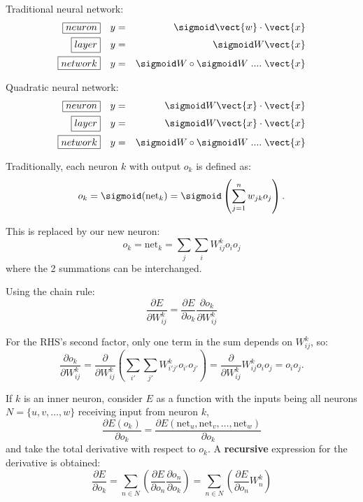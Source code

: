 Traditional neural network:
\begin{eqnarray}
\boxed{neuron} \quad & y = & \sigmoid \vect{w} \cdot \vect{x} \nonumber \\
\boxed{layer} \quad & y = & \sigmoid W \vect{x} \nonumber \\
\boxed{network} \quad & y = & \sigmoid W \circ \sigmoid W \; .... \; \vect{x} 
\end{eqnarray}

Quadratic neural network:
\begin{eqnarray}
\boxed{neuron} \quad & y = & \sigmoid W \vect{x} \cdot \vect{x} \nonumber \\
\boxed{layer} \quad & y = & \sigmoid W \vect{x} \cdot \vect{x} \nonumber \\
\boxed{network} \quad & y = & \sigmoid W \circ \sigmoid W \; .... \; \vect{x} 
\end{eqnarray}

Traditionally, each neuron $k$ with output $o_k$ is defined as:
\begin{equation}
o_k = \sigmoid ({\text{net}}_k) = \sigmoid \left(\sum _{j=1}^{n} w_{jk} o_j \right) .
\end{equation}

This is replaced by our new neuron:
\begin{equation}
o_k = {\text{net}}_k = \sum_j \sum_i W_{ij}^k o_i o_j
\end{equation}
where the 2 summations can be interchanged.

Using the chain rule:
\begin{equation}
\frac{\partial E}{\partial W_{ij}^k}
= \frac{\partial E}{\partial o_k} \frac{\partial o_k}{\partial W_{ij}^k}
\end{equation}

For the RHS's second factor, only one term in the sum depends on $W_{ij}^k$, so:
\begin{equation}
\frac{\partial o_k}{\partial W_{ij}^k}
= \frac{\partial }{\partial W_{ij}^k} \left( \sum_{i'} \sum_{j'} W_{i' j'}^k o_{i'} o_{j'} \right)
= \frac{\partial }{\partial W_{ij}^k} W_{ij}^k o_i o_j = o_i o_j .
\end{equation}

If $k$ is an inner neuron, consider $E$ as a function with the inputs being all neurons $N = \{ u, v, \dots , w \}$  receiving input from neuron $k$,
\begin{equation}
\frac{\partial E(o_k)}{\partial o_k}
= \frac{\partial E(\mathrm {net}_u, \text{net}_v, \dots ,\mathrm{net}_w)}{\partial o_k}
\end{equation}
and take the total derivative with respect to $o_k$. A \textbf{recursive} expression for the derivative is obtained:
\begin{equation}
\frac{\partial E}{\partial o_k}
= \sum_{n \in N} \left( \frac{\partial E}{\partial o_n} \frac{\partial o_n}{\partial o_k} \right)
= \sum_{n \in N} \left( \frac{\partial E}{\partial o_n} W_{n}^k \right)
\end{equation}


